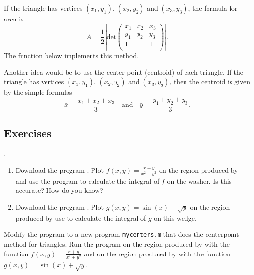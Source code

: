 If the triangle has vertices $(x_1,y_1)$, $(x_2,y_2)$
and $(x_3,y_3)$,  the formula for area is
\begin{equation}\label{triarea}
A =
\frac{1}{2}\left|
\text{det}\left(
\begin{array}{ccc}
x_1	&x_2	&x_3\\
y_1	&y_2	&y_3\\
1	&1	&1\\
\end{array}
\right)
\right|
.
\end{equation}
The function  below implements this method.


Another idea would be to use the center point (centroid) of
each triangle. If the triangle has vertices $(x_1,y_1)$, $(x_2,y_2)$
and $(x_3,y_3)$, then the centroid is given by the simple
formulas
\begin{equation}\label{tricenter}
\bar{x} = \frac{x_1 + x_2 + x_3}{3}
\quad\text{and}\quad
\bar{y} = \frac{y_1 + y_2 + y_3}{3}.
\end{equation}



\subsection*{Exercises}
\begin{list}
{.}{}


\item  
   \begin{enumerate}
      \item[a.] Download the program .
      Plot $f(x,y) = \frac{x+y}{x^2+y^2}$ on the region produced  by  and 
      use the program  to calculate the integral of $f$ on the washer.
      Is this accurate? How do you know?
      \item[b.] Download the program .
      Plot $g(x,y) = \sin(x) + \sqrt{y}$ on the region produced  by 
      use  to calculate the integral of $g$ on this wedge.
   \end{enumerate}

\item
  Modify the program 
  to a new program
\verb&mycenters.m& that does the centerpoint method for triangles. Run
the program on the region produced by  with the
function $f(x,y) = \frac{x+y}{x^2+y^2}$ and on the region produced by
 with the function $g(x,y) = \sin(x) + \sqrt{y}$.

\end{list}

